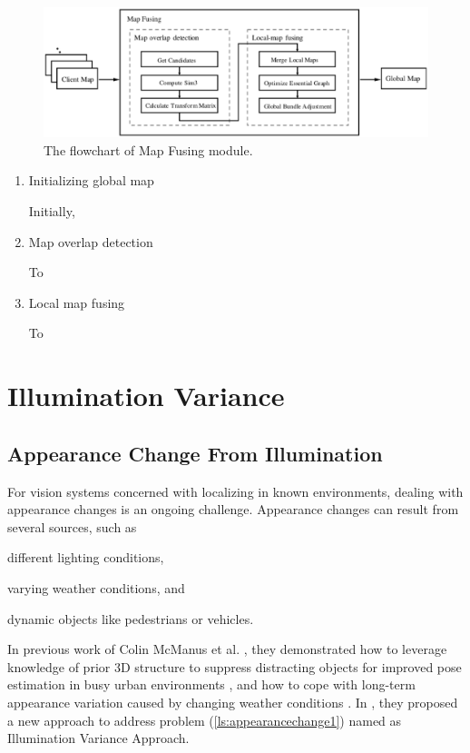 \begin{figure}[H]
	\centering
	\includegraphics[width=5in]{Chapter2/corbslamserver.eps}
	\caption{The flowchart of Map Fusing module.}
	\label{fig:corbslamserver} 
\end{figure}

\begin{enumerate}[1.]
	\item Initializing global map
	
	Initially,
	
	\item Map overlap detection
	
	To
	
	\item Local map fusing 
	
	To 
\end{enumerate}

\section{Illumination Variance}

\subsection{Appearance Change From Illumination}

For vision systems concerned with localizing in known environments, dealing with appearance changes is an ongoing challenge. Appearance changes can result from several sources, such as 
\begin{inparaenum}[(i)]
	\item different lighting conditions,	
	\label{ls:appearancechange1}
	\item varying weather conditions, and
	\label{ls:appearancechange2}
	\item dynamic objects like pedestrians or vehicles.
	\label{ls:appearancechange3}
\end{inparaenum}

In previous work of Colin McManus et al. , they demonstrated how to leverage knowledge of prior 3D structure to suppress distracting objects for improved pose estimation in busy urban environments \cite{mcmanus2013distraction}, and how to cope with long-term appearance variation caused by changing weather conditions \cite{churchill2012practice}. In \cite{maddern2014illumination}, they proposed a new approach to address problem (\ref{ls:appearancechange1}) named as Illumination Variance Approach. 

